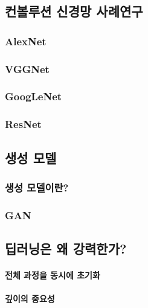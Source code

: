\documentclass [12pt] {oblivoir}
\let\oldsubsubsection=\subsubsection
\renewcommand{\subsubsection}
{
  \filbreak
  \oldsubsubsection
}
\begin{document}
\vspace{3mm}

\subsection{컨볼루션 신경망 사례연구}

\subsubsection{AlexNet}

\subsubsection{VGGNet}

\subsubsection{GoogLeNet}

\subsubsection{ResNet}

\subsection{생성 모델}

\subsubsection{생성 모델이란?}

\subsubsection{GAN}

\subsection{딥러닝은 왜 강력한가?}

\paragraph*{전체 과정을 동시에 초기화}\mbox{}

\vspace{3mm}

\paragraph*{깊이의 중요성}\mbox{}
\end{document}
